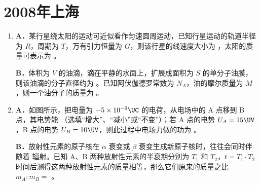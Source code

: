 \documentclass[\gkver]{gaokaozhenti}
\begin{document}
\chapter{2008年上海}

\begin{enumerate}
\item
\textbf{A．}某行星绕太阳的运动可近似看作匀速圆周运动，已知行星运动的轨道半径为 $R$，周期为 $T$，万有引力恒量为 $G$，则该行星的线速度大小为 ，太阳的质量可表示为 。

\textbf{B．}体积为 $V$ 的油滴，滴在平静的水面上，扩展成面积为 $S$ 的单分子油膜，则该油滴的分子直径约为 。已知阿伏伽德罗常数为 $N_{A}$，油的摩尔质量为 $M$，则一个油分子的质量为 。



\item
\textbf{A．}如图所示，把电量为 $-5\times10^{-9}\UC$ 的电荷，从电场中的 A 点移到 B 点，其电势能 （选填“增大”、“减小”或“不变”）；若 A 点的电势 $U_{A}=15\UV$，B 点的电势 $U_{B}=10\UV$，则此过程中电场力做的功为 。

\onepicture[align=right, w=3.48cm]{}

\textbf{B．}放射性元素的原子核在 $\alpha$ 衰变或 $\beta$ 衰变生成新原子核时，往往会同时伴随着 \tkanswer[1.2cm]{$\gamma$} 辐射。已知 A、B 两种放射性元素的半衰期分别为 $T_{1}$ 和 $T_{2}$，$t=T_{1}\cdot T_{2}$ 时间后测得这两种放射性元素的质量相等，那么它们原来的质量之比 $m_{A}:m_{B}=$ 。


\end{enumerate}
\end{document}
